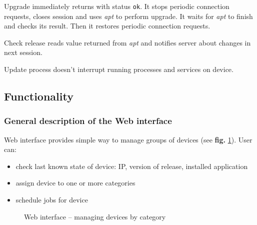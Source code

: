 Upgrade immediately returns with status \verb|ok|. It stops periodic connection requests, closes session and uses \emph{apt} to perform upgrade. It waits for \emph{apt} to finish and checks its result. Then it restores periodic connection requests.

Check release reads value returned from \emph{apt} and notifies server about changes in next session.

Update process doesn't interrupt running processes and services on device. 

\subsection{Functionality}

\subsubsection{General description of the Web interface}

Web interface provides simple way to manage groups of devices (see \textbf{fig.} \ref{fig:gui}). User can:
\begin{itemize}
  \item check last known state of device: IP, version of release, installed application
  \item assign device to one or more categories
  \item schedule jobs for device
\end{itemize}

\begin{figure}[htbp]
  \centering
    \caption{Web interface -- managing devices by category}
    \label{fig:gui}
\end{figure}

